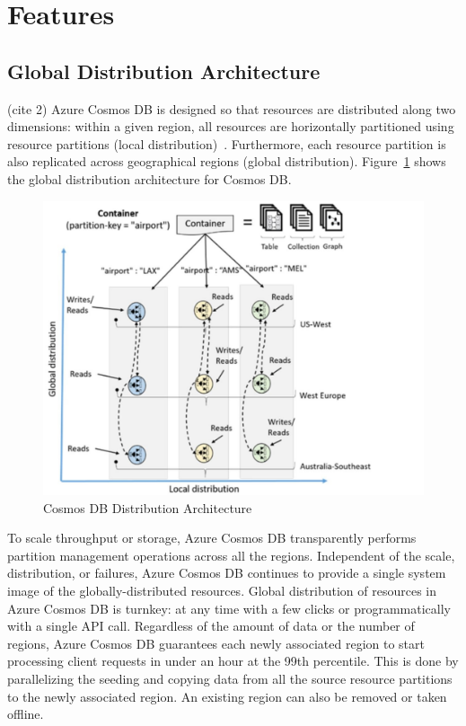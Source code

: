 \section{Features}

\subsection{Global Distribution Architecture}
(cite 2) Azure Cosmos DB is designed so that resources are distributed
along two dimensions: within a given region, all resources are
horizontally partitioned using resource partitions (local
distribution)~\cite{hid-sp18-501-AzureBlog}. Furthermore, each
resource partition is also replicated across geographical regions
(global distribution). Figure~\ref{f:architecture} shows the global
distribution architecture for Cosmos DB.


\begin{figure}[!ht]
  \centering\includegraphics[width=\columnwidth]{images/globe.pdf}
  \caption{Cosmos DB Distribution Architecture~\cite{hid-sp18-501-AzureBlog}}
\label{f:architecture}
\end{figure}


To scale throughput or storage, Azure Cosmos DB transparently performs
partition management operations across all the regions. Independent of
the scale, distribution, or failures, Azure Cosmos DB continues to
provide a single system image of the globally-distributed
resources. Global distribution of resources in Azure Cosmos DB is
turnkey: at any time with a few clicks or programmatically with a
single API call. Regardless of the amount of data or the number of
regions, Azure Cosmos DB guarantees each newly associated region to
start processing client requests in under an hour at the 99th
percentile. This is done by parallelizing the seeding and copying data
from all the source resource partitions to the newly associated
region. An existing region can also be removed or taken offline.

